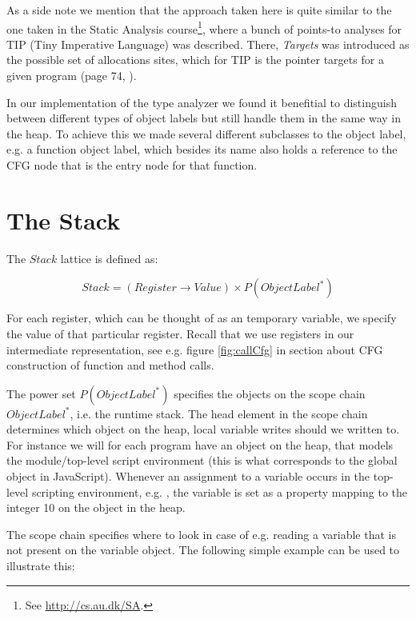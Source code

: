 As a side note we mention that the approach taken here is quite similar to the one taken in the Static Analysis course\footnote{See \url{http://cs.au.dk/SA}.}, where a bunch of points-to analyses for TIP (Tiny Imperative Language) was described. There, \textit{Targets} was introduced as the possible set of allocations sites, which for TIP is the pointer targets  for a given program (page 74, \cite{sa}).

In our implementation of the type analyzer we found it benefitial to distinguish between different types of object labels but still handle them in the same way in the heap. To achieve this we made several different subclasses to the object label, e.g. a function object label, which besides its name also holds a reference to the CFG node that is the entry node for that function.

\section{The Stack}
The $Stack$ lattice is defined as:

\begin{equation*}
Stack = (Register \rightarrow Value) \times P(ObjectLabel^{*})
\end{equation*}

For each register, which can be thought of as an temporary variable, we specify the value of that particular register. Recall that we use registers in our intermediate representation, see e.g. figure \ref{fig:callCfg} in section \label{CFG calls} about CFG construction of function and method calls.

The power set $P(ObjectLabel^{*})$ specifies the objects on the scope chain $ObjectLabel^{*}$, i.e. the runtime stack. The head element in the scope chain determines which object on the heap, local variable writes should we written to. For instance we will for each program have an object on the heap, that models the module/top-level script environment \cite{pyref.main} (this is what corresponds to the global object in JavaScript). Whenever an assignment to a variable occurs in the top-level scripting environment, e.g. , the variable  is set as a property mapping to the integer 10 on the  object in the heap.

The scope chain specifies where to look in case of e.g. reading a variable that is not present on the variable object. The following simple example can be used to illustrate this:

